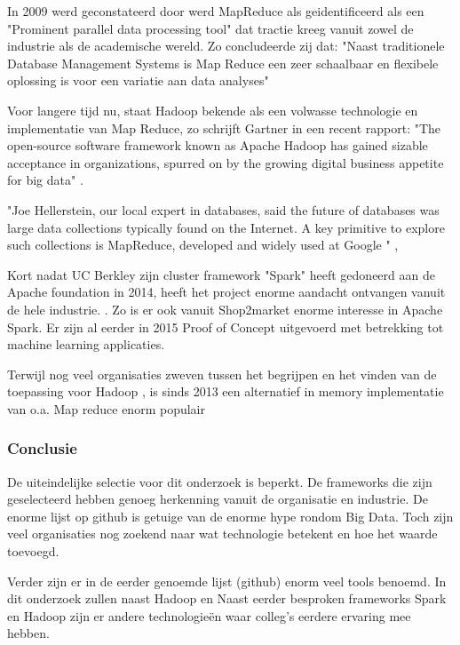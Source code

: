 In 2009 werd geconstateerd door \cite{aarnio2009parallel} werd MapReduce als geidentificeerd als een "Prominent parallel data processing tool" dat tractie kreeg vanuit zowel de industrie als de academische wereld. Zo concludeerde zij dat: "Naast traditionele Database Management Systems is Map Reduce een zeer schaalbaar en flexibele oplossing is voor een variatie aan data analyses" \parencite{aarnio2009parallel}

Voor langere tijd nu, staat Hadoop bekende als een volwasse technologie en implementatie van Map Reduce, zo schrijft Gartner in een recent rapport: "The open-source software framework known as Apache Hadoop has gained sizable acceptance in organizations, spurred on by the growing digital business appetite for big data" \parencite{hadoop2013selection}.


"Joe Hellerstein, our local expert in databases, said the future of databases was large data
collections typically found on the Internet. A key primitive to explore such collections is
MapReduce, developed and widely used at Google \parencite{dean2008mapreduce}" \parencite{asanovic2006landscape}, 

Kort nadat UC Berkley zijn cluster framework "Spark" heeft gedoneerd aan de Apache foundation in 2014, heeft het project enorme aandacht ontvangen vanuit de hele industrie. \parencite{spark2015intro}. Zo is er ook vanuit Shop2market enorme interesse in Apache Spark. Er zijn al eerder in 2015 Proof of Concept uitgevoerd met betrekking tot machine learning applicaties.

Terwijl nog veel organisaties zweven tussen het begrijpen en het vinden van de toepassing voor Hadoop \parencite{hadoop2015adoption}, is sinds 2013 een alternatief in memory implementatie van o.a. Map reduce enorm populair  \parencite{spark2015intro}

\subsubsection{\textbf{Conclusie}}

De uiteindelijke selectie voor dit onderzoek is beperkt. De frameworks die zijn geselecteerd hebben genoeg herkenning vanuit de organisatie en industrie. De enorme lijst op github is getuige van de enorme hype rondom Big Data. Toch zijn veel organisaties nog zoekend naar wat technologie betekent en hoe het waarde toevoegd\parencite{hadoop2015adoption}.

Verder zijn er in de eerder genoemde lijst (github) enorm veel tools benoemd. In dit onderzoek zullen naast Hadoop en Naast eerder besproken frameworks Spark en Hadoop zijn er andere technologieën waar colleg's eerdere ervaring mee hebben.

